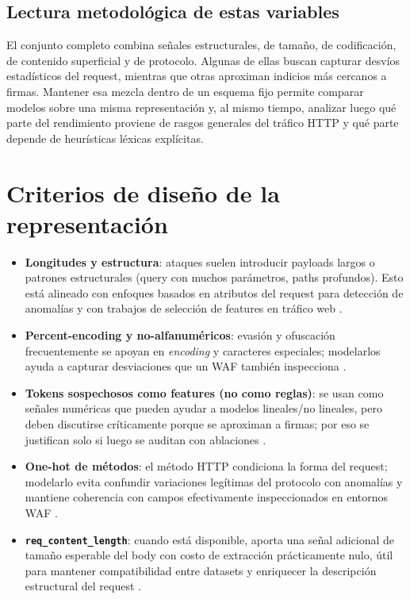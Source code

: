 \documentclass[12pt,oneside]{report}
\begin{document}
\subsection{Lectura metodológica de estas variables}
El conjunto completo combina señales estructurales, de tamaño, de codificación, de contenido superficial y de protocolo. Algunas de ellas buscan capturar desvíos estadísticos del request, mientras que otras aproximan indicios más cercanos a firmas. Mantener esa mezcla dentro de un esquema fijo permite comparar modelos sobre una misma representación y, al mismo tiempo, analizar luego qué parte del rendimiento proviene de rasgos generales del tráfico HTTP y qué parte depende de heurísticas léxicas explícitas.

\section{Criterios de diseño de la representación}
\begin{itemize}[leftmargin=*]
  \item \textbf{Longitudes y estructura}: ataques suelen introducir payloads largos o patrones estructurales (query con muchos parámetros, paths profundos). Esto está alineado con enfoques basados en atributos del request para detección de anomalías y con trabajos de selección de features en tráfico web \cite{kruegel_vigna_2003,riverol_2024}.
  \item \textbf{Percent-encoding y no-alfanuméricos}: evasión y ofuscación frecuentemente se apoyan en \textit{encoding} y caracteres especiales; modelarlos ayuda a capturar desviaciones que un WAF también inspecciona \cite{owasp_waf,modsecurity_site}.
  \item \textbf{Tokens sospechosos como features (no como reglas)}: se usan como señales numéricas que pueden ayudar a modelos lineales/no lineales, pero deben discutirse críticamente porque se aproximan a firmas; por eso se justifican solo si luego se auditan con ablaciones \cite{kruegel_vigna_2003,riverol_2024}.
  \item \textbf{One-hot de métodos}: el método HTTP condiciona la forma del request; modelarlo evita confundir variaciones legítimas del protocolo con anomalías y mantiene coherencia con campos efectivamente inspeccionados en entornos WAF \cite{owasp_waf,modsecurity_site}.
  \item \textbf{\texttt{req\_content\_length}}: cuando está disponible, aporta una señal adicional de tamaño esperable del body con costo de extracción prácticamente nulo, útil para mantener compatibilidad entre datasets y enriquecer la descripción estructural del request \cite{srbh_paper,owasp_waf}.
\end{itemize}
\end{document}
